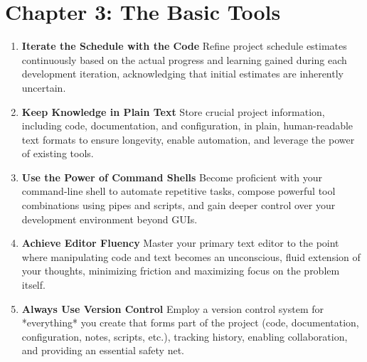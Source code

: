 \documentclass[11pt]{article}
\begin{document}
\section*{Chapter 3: The Basic Tools}
\begin{enumerate}[label=\arabic*., start=24, itemsep=1ex]
    \item \textbf{Iterate the Schedule with the Code}
    Refine project schedule estimates continuously based on the actual progress and learning gained during each development iteration, acknowledging that initial estimates are inherently uncertain.

    \item \textbf{Keep Knowledge in Plain Text}
    Store crucial project information, including code, documentation, and configuration, in plain, human-readable text formats to ensure longevity, enable automation, and leverage the power of existing tools.

    \item \textbf{Use the Power of Command Shells}
    Become proficient with your command-line shell to automate repetitive tasks, compose powerful tool combinations using pipes and scripts, and gain deeper control over your development environment beyond GUIs.

    \item \textbf{Achieve Editor Fluency}
    Master your primary text editor to the point where manipulating code and text becomes an unconscious, fluid extension of your thoughts, minimizing friction and maximizing focus on the problem itself.

    \item \textbf{Always Use Version Control}
    Employ a version control system for *everything* you create that forms part of the project (code, documentation, configuration, notes, scripts, etc.), tracking history, enabling collaboration, and providing an essential safety net.
\end{enumerate}
\end{document}
